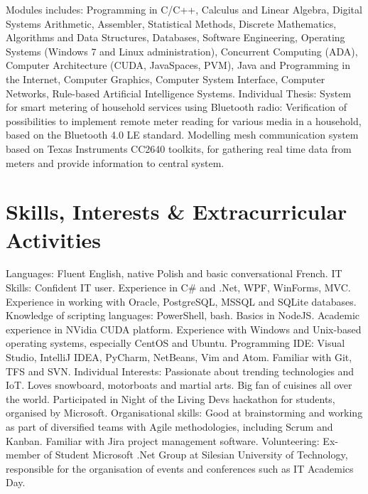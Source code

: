 \documentclass[12pt,english]{resume}
\begin{document}
			Modules includes: Programming in C/C++, Calculus and Linear Algebra, Digital Systems Arithmetic, Assembler, Statistical Methods, Discrete Mathematics, Algorithms and Data Structures, Databases,
			Software Engineering, Operating Systems (Windows 7 and Linux administration), Concurrent Computing (ADA), Computer Architecture (CUDA, JavaSpaces, PVM), Java and Programming in the Internet, Computer Graphics, Computer System Interface, Computer Networks, Rule-based Artificial Intelligence Systems.
			Individual Thesis: System for smart metering of household services using Bluetooth radio:
			Verification of possibilities to implement remote meter reading for various media in a household, based on the Bluetooth 4.0 LE standard. Modelling mesh communication system based on Texas Instruments CC2640 toolkits, for gathering real time data from meters and provide information to central system.

	\section{Skills, Interests \& Extracurricular Activities}
		Languages: Fluent English, native Polish and basic conversational French.
		IT Skills: Confident IT user. Experience in C\# and .Net, WPF, WinForms, MVC. Experience in working with Oracle, PostgreSQL, MSSQL and SQLite databases. Knowledge of scripting languages: PowerShell, bash. Basics in NodeJS. Academic experience in NVidia CUDA platform. Experience with Windows and Unix-based operating systems, especially CentOS and Ubuntu. Programming IDE: Visual Studio, IntelliJ IDEA, PyCharm, NetBeans, Vim and Atom. Familiar with Git, TFS and SVN.
		Individual Interests: Passionate about trending technologies and IoT. Loves snowboard, motorboats and martial arts. Big fan of cuisines all over the world. Participated in Night of the Living Devs hackathon for students, organised by Microsoft.
		Organisational skills: Good at brainstorming and working as part of diversified teams with Agile methodologies, including Scrum and Kanban. Familiar with Jira project management software.
		Volunteering: Ex-member of Student Microsoft .Net Group at Silesian University of Technology, responsible for the organisation of events and conferences such as IT Academics Day.
\end{document}
